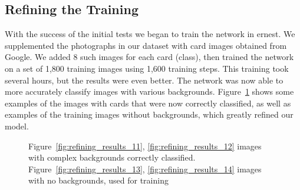 \documentclass[letterpaper]{article}
\begin{document}
\subsection{Refining the Training}
With the success of the initial tests we began to train the network in ernest. We supplemented the photographs in our dataset with card images obtained from Google. We added 8 such images for each card (class), then trained the network on a set of 1,800 training images using 1,600 training steps.  This training took several hours, but the results were even better.  The network was now able to more accurately classify images with various backgrounds. Figure~\ref{fig:refining_results_1} shows some examples of the images with cards that were now correctly classified, as well as examples of the training images without backgrounds, which greatly refined our model.

\begin{figure}
  \centering

  \caption{\label{fig:refining_results_1}Figure~\ref{fig:refining_results_11}, \ref{fig:refining_results_12} images with complex backgrounds correctly classified. Figure~\ref{fig:refining_results_13}, \ref{fig:refining_results_14} images with no backgrounds, used for training}
\end{figure}
\end{document}
